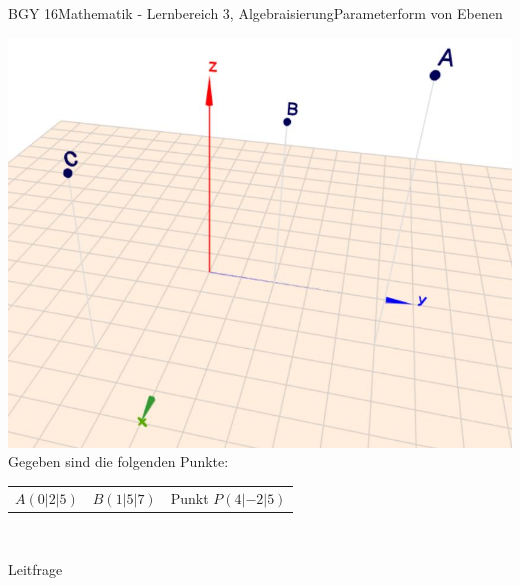 \documentclass[oneside,openany,headings=optiontotoc,11pt,numbers=noenddot]{scrreprt}
\begin{document}
	\begin{worksheet}{BGY 16}{Mathematik - Lernbereich 3, Algebraisierung}{Parameterform von Ebenen}
		
		\begin{framed}
			\includegraphics[scale=0.95]{Bilder/geradePunkt.jpg}\\
			Gegeben sind die folgenden Punkte:\\
			\begin{tabularx}{\textwidth}{XXX}
				\(A(0|2|5)\)& \(B(1|5|7)\) & Punkt \(P(4|-2|5)\)\\
			\end{tabularx}\\
			\par\noindent
		\end{framed}
		\begin{framed}
			\tiny{\color{codegray}Leitfrage}\\
			\par\bigskip\noindent
		\end{framed}
		\begin{framed}

\end{framed}
\end{worksheet}
\end{document}
